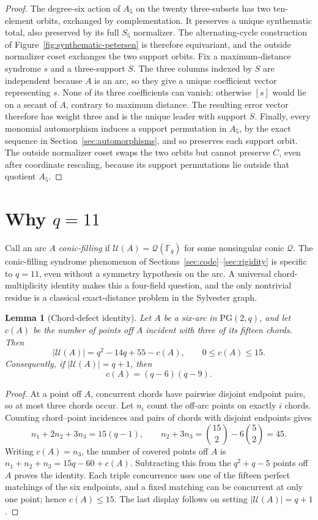\documentclass[11pt]{article}
\newtheorem{lemma}[theorem]{Lemma}
\theoremstyle{definition}
\theoremstyle{remark}
\newcommand{\PG}{\mathrm{PG}}
\newcommand{\F}{\mathbb{F}}
\newcommand{\cU}{\mathcal{U}}
\begin{document}
\begin{proof}
The degree-six action of $A_5$ on the twenty three-subsets has two
ten-element orbits, exchanged by complementation. It preserves a unique
synthematic total, also preserved by
its full $S_5$ normalizer. The alternating-cycle construction of
Figure~\ref{fig:synthematic-petersen} is therefore equivariant, and the
outside normalizer coset exchanges the two support orbits. Fix a
maximum-distance syndrome $s$ and a three-support $S$. The three columns
indexed by $S$ are independent because $A$ is an arc, so they give a unique
coefficient vector representing $s$. None of its three coefficients can
vanish: otherwise $[s]$ would lie on a secant of $A$, contrary to maximum
distance. The resulting error vector therefore has weight three and is the
unique leader with support $S$. Finally, every monomial automorphism induces
a support permutation in $A_5$, by the exact sequence in
Section~\ref{sec:automorphisms}, and so preserves each support orbit. The
outside normalizer coset swaps the two orbits but cannot preserve $C$, even
after coordinate rescaling, because its support permutations lie outside
that quotient $A_5$.
\end{proof}

\section{Why \texorpdfstring{$q=11$}{q=11}}
\label{sec:why11}

Call an arc $A$ \emph{conic-filling} if $\cU(A)=\mathcal Q(\F_q)$ for some
nonsingular conic $\mathcal Q$. The conic-filling syndrome phenomenon of
Sections~\ref{sec:code}--\ref{sec:rigidity} is specific to $q=11$, even
without a symmetry hypothesis on the arc. A universal chord-multiplicity
identity makes this a four-field question, and the only nontrivial residue
is a classical exact-distance problem in the Sylvester graph.

\begin{lemma}[Chord-defect identity]
\label{lem:chord-defect}
Let $A$ be a six-arc in $\PG(2,q)$, and let $c(A)$ be the number of points
off $A$ incident with three of its fifteen chords. Then
\[
 |\cU(A)|=q^2-14q+55-c(A),\qquad 0\le c(A)\le15.
\]
Consequently, if $|\cU(A)|=q+1$, then
\[
 c(A)=(q-6)(q-9).
\]
\end{lemma}

\begin{proof}
At a point off $A$, concurrent chords have pairwise disjoint endpoint
pairs, so at most three chords occur. Let $n_i$ count the off-arc points on
exactly $i$ chords. Counting chord--point incidences and pairs of chords
with disjoint endpoints gives
\[
 n_1+2n_2+3n_3=15(q-1),\qquad
 n_2+3n_3=\binom{15}{2}-6\binom{5}{2}=45.
\]
Writing $c(A)=n_3$, the number of covered points off $A$ is
$n_1+n_2+n_3=15q-60+c(A)$. Subtracting this from the
$q^2+q-5$ points off $A$ proves the identity. Each triple concurrence
uses one of the fifteen perfect matchings of the six endpoints, and a fixed
matching can be concurrent at only one point; hence $c(A)\le15$. The last
display follows on setting $|\cU(A)|=q+1$.
\end{proof}
\end{document}
